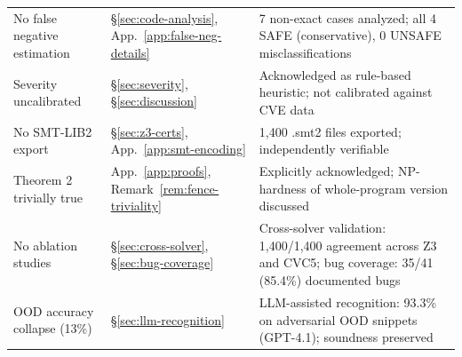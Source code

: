 \documentclass[11pt]{article}
\begin{document}
\begin{longtable}{p{5cm}p{2cm}p{5cm}}
No false negative estimation &
  \S\ref{sec:code-analysis}, App.~\ref{app:false-neg-details} &
  7 non-exact cases analyzed; all 4 SAFE (conservative),
  0 UNSAFE misclassifications \\
Severity uncalibrated &
  \S\ref{sec:severity}, \S\ref{sec:discussion} &
  Acknowledged as rule-based heuristic; not calibrated
  against CVE data \\
No SMT-LIB2 export &
  \S\ref{sec:z3-certs}, App.~\ref{app:smt-encoding} &
  1{,}400 .smt2 files exported; independently verifiable \\
Theorem 2 trivially true &
  App.~\ref{app:proofs}, Remark~\ref{rem:fence-triviality} &
  Explicitly acknowledged; NP-hardness of whole-program
  version discussed \\
No ablation studies &
  \S\ref{sec:cross-solver}, \S\ref{sec:bug-coverage} &
  Cross-solver validation: 1{,}400/1{,}400 agreement across
  Z3 and CVC5; bug coverage: 35/41 (85.4\%) documented bugs \\
OOD accuracy collapse (13\%) &
  \S\ref{sec:llm-recognition} &
  LLM-assisted recognition: 93.3\% on adversarial OOD
  snippets (GPT-4.1); soundness preserved \\
\end{longtable}
\end{document}
